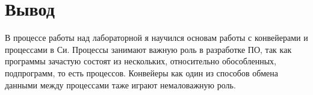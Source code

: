 \section{Вывод}

В процессе работы над лабораторной я научился основам работы с конвейерами и процессами в Си. Процессы занимают важную роль в разработке ПО, так как программы зачастую состоят из нескольких, относительно обособленных, подпрограмм, то есть процессов. Конвейеры как один из способов обмена данными между процессами таже играют немаловажную роль.

